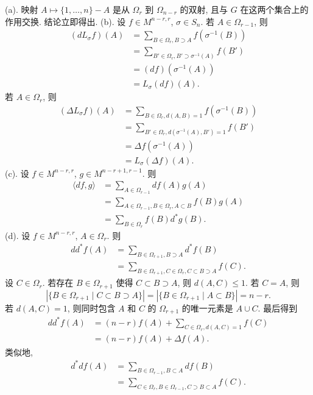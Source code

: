 \begin{solution}
(a). 映射 $A \longmapsto \{1, \ldots, n\} - A$ 是从 $\Omega_r$ 到 $\Omega_{n-r}$ 的双射, 且与 $G$ 在这两个集合上的作用交换. 结论立即得出.
(b). 设 $f \in M^{n-r,r}$, $\sigma \in S_n$. 若 $A \in \Omega_{r-1}$, 则
\begin{align*}
(dL_\sigma f)(A) &= \sum_{B \in \Omega_r, B \supset A}f(\sigma^{-1}(B)) \\
&= \sum_{B' \in \Omega_r, B' \supset \sigma^{-1}(A)}f(B') \\
&= (df)(\sigma^{-1}(A)) \\
&= L_\sigma(df)(A).
\end{align*}
若 $A \in \Omega_r$, 则
\begin{align*}
(\Delta L_\sigma f)(A) &= \sum_{B \in \Omega_r, d(A,B)=1}f(\sigma^{-1}(B)) \\
&= \sum_{B' \in \Omega_r, d(\sigma^{-1}(A),B')=1}f(B') \\
&= \Delta f(\sigma^{-1}(A)) \\
&= L_\sigma(\Delta f)(A).
\end{align*}
(c). 设 $f \in M^{n-r,r}$, $g \in M^{n-r+1,r-1}$. 则
\begin{align*}
\langle df, g \rangle &= \sum_{A \in \Omega_{r-1}}df(A)g(A) \\
&= \sum_{A \in \Omega_{r-1}, B \in \Omega_r, A \subset B}f(B)g(A) \\
&= \sum_{B \in \Omega_r}f(B)d^*g(B).
\end{align*}
(d). 设 $f \in M^{n-r,r}$, $A \in \Omega_r$. 则
\begin{align*}
dd^*f(A) &= \sum_{B \in \Omega_{r+1}, B \supset A}d^*f(B) \\
&= \sum_{B \in \Omega_{r+1}, C \in \Omega_r, C \subset B \supset A}f(C).
\end{align*}
设 $C \in \Omega_r$. 若存在 $B \in \Omega_{r+1}$ 使得 $C \subset B \supset A$, 则 $d(A, C) \leq 1$. 若 $C = A$, 则
\[
|\{B \in \Omega_{r+1} \mid C \subset B \supset A\}| = |\{B \in \Omega_{r+1} \mid A \subset B\}| = n - r.
\]
若 $d(A, C) = 1$, 则同时包含 $A$ 和 $C$ 的 $\Omega_{r+1}$ 的唯一元素是 $A \cup C$. 最后得到
\begin{align*}
dd^*f(A) &= (n - r)f(A) + \sum_{C \in \Omega_r, d(A,C)=1}f(C) \\
&= (n - r)f(A) + \Delta f(A).
\end{align*}
类似地,
\begin{align*}
d^*df(A) &= \sum_{B \in \Omega_{r-1}, B \subset A}df(B) \\
&= \sum_{C \in \Omega_r, B \in \Omega_{r-1}, C \supset B \subset A}f(C).

\end{align*}
\end{solution}
